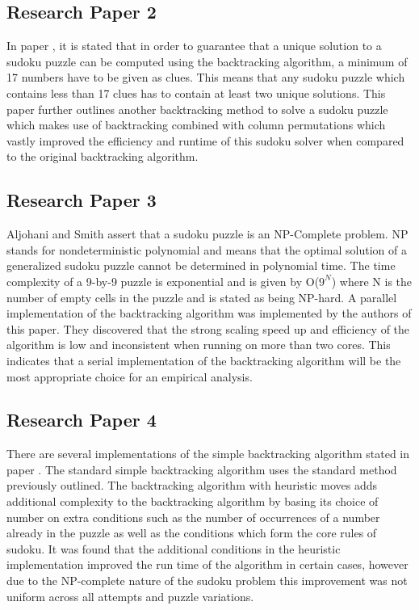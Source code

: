 \documentclass[11pt]{article}
\begin{document}
\subsection{Research Paper 2}
In paper \cite{SJAR}, it is stated that in order to guarantee that a unique solution to a sudoku puzzle can be computed using the backtracking algorithm,
 a minimum of 17 numbers have to be given as clues. This means that any sudoku puzzle which contains less than 17 clues has to contain at least two unique solutions. 
This paper further outlines another backtracking method to solve a sudoku puzzle which makes use of backtracking combined with column permutations which vastly improved the efficiency and
 runtime of this sudoku solver when compared to the original backtracking algorithm.

\subsection{Research Paper 3}
Aljohani and Smith \cite{AAWS} assert that a sudoku puzzle is an NP-Complete problem. 
 NP stands for nondeterministic polynomial and means that the optimal solution of a generalized sudoku puzzle cannot be determined in polynomial time. 
 The time complexity of a 9-by-9 puzzle is exponential and is given by O($9^N$) where N is the number of empty cells in the puzzle and is stated as being NP-hard. 
A parallel implementation of the backtracking algorithm was implemented by the authors of this paper.
 They discovered that the strong scaling speed up and efficiency of the algorithm is low and inconsistent when running on more than two cores. 
 This indicates that a serial implementation of the backtracking algorithm will be the most appropriate choice for an empirical analysis. 


\subsection{Research Paper 4}
There are several implementations of the simple backtracking algorithm stated in paper \cite{LCGL}.
 The standard simple backtracking algorithm uses the standard method previously outlined. The backtracking algorithm with heuristic moves adds additional 
 complexity to the backtracking algorithm by basing its choice of number on extra conditions such as the number of occurrences of a number already in the puzzle as well as the
  conditions which form the core rules of sudoku. 
It was found that the additional conditions in the heuristic implementation improved the run time of the algorithm in certain cases, 
however due to the NP-complete nature of the sudoku problem this improvement was not uniform across all attempts and puzzle variations. 
\end{document}
